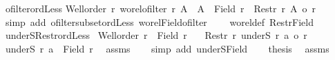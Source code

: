 \begin{isabellebody}
\isanewline
{}\isamarkupfalse%
%
\endisatagproof
{\isafoldproof}%
%
\isadelimproof
\isanewline
%
\endisadelimproof
\isanewline
{}\isamarkupfalse%
\ ofilter{\isacharunderscore}{\kern0pt}ordLess{\isacharcolon}{\kern0pt}\isanewline
{\isachardoublequoteopen}{\isasymlbrakk}Well{\isacharunderscore}{\kern0pt}order\ r{\isacharsemicolon}{\kern0pt}\ wo{\isacharunderscore}{\kern0pt}rel{\isachardot}{\kern0pt}ofilter\ r\ A{\isasymrbrakk}\ {\isasymLongrightarrow}\ {\isacharparenleft}{\kern0pt}A\ {\isacharless}{\kern0pt}\ Field\ r{\isacharparenright}{\kern0pt}\ {\isacharequal}{\kern0pt}\ {\isacharparenleft}{\kern0pt}Restr\ r\ A\ {\isacharless}{\kern0pt}o\ r{\isacharparenright}{\kern0pt}{\isachardoublequoteclose}\isanewline
%
\isadelimproof
%
\endisadelimproof
%
\isatagproof
{}\isamarkupfalse%
\ {\isacharparenleft}{\kern0pt}simp\ add{\isacharcolon}{\kern0pt}\ ofilter{\isacharunderscore}{\kern0pt}subset{\isacharunderscore}{\kern0pt}ordLess\ wo{\isacharunderscore}{\kern0pt}rel{\isachardot}{\kern0pt}Field{\isacharunderscore}{\kern0pt}ofilter\isanewline
\ \ \ \ wo{\isacharunderscore}{\kern0pt}rel{\isacharunderscore}{\kern0pt}def\ Restr{\isacharunderscore}{\kern0pt}Field{\isacharparenright}{\kern0pt}%
\endisatagproof
{\isafoldproof}%
%
\isadelimproof
\isanewline
%
\endisadelimproof
\isanewline
{}\isamarkupfalse%
\ underS{\isacharunderscore}{\kern0pt}Restr{\isacharunderscore}{\kern0pt}ordLess{\isacharcolon}{\kern0pt}\isanewline
{}\ {\isachardoublequoteopen}Well{\isacharunderscore}{\kern0pt}order\ r{\isachardoublequoteclose}\ \ {\isachardoublequoteopen}Field\ r\ {\isasymnoteq}\ {\isacharbraceleft}{\kern0pt}{\isacharbraceright}{\kern0pt}{\isachardoublequoteclose}\isanewline
{}\ {\isachardoublequoteopen}Restr\ r\ {\isacharparenleft}{\kern0pt}underS\ r\ a{\isacharparenright}{\kern0pt}\ {\isacharless}{\kern0pt}o\ r{\isachardoublequoteclose}\isanewline
%
\isadelimproof
%
\endisadelimproof
%
\isatagproof
{}\isamarkupfalse%
{\isacharminus}{\kern0pt}\isanewline
\ \ \isamarkupfalse%
\ {\isachardoublequoteopen}underS\ r\ a\ {\isacharless}{\kern0pt}\ Field\ r{\isachardoublequoteclose}\ \isamarkupfalse%
\ assms\isanewline
\ \ \isamarkupfalse%
\ {\isacharparenleft}{\kern0pt}simp\ add{\isacharcolon}{\kern0pt}\ underS{\isacharunderscore}{\kern0pt}Field{}{\isacharparenright}{\kern0pt}\isanewline
\ \ \isamarkupfalse%
\ {\isacharquery}{\kern0pt}thesis\ \isamarkupfalse%
\ assms\isanewline

\end{isabellebody}
